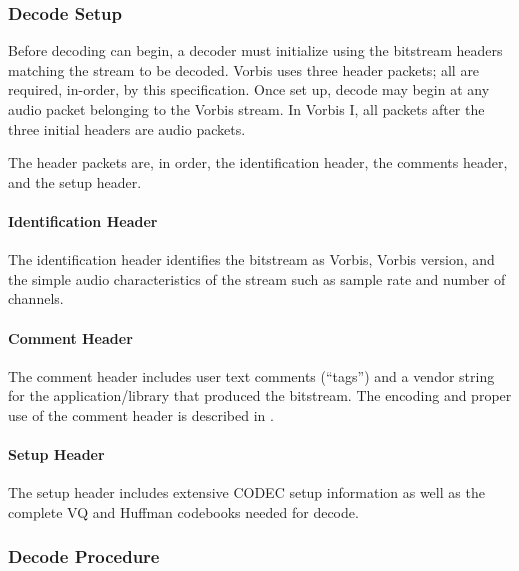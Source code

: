 \subsubsection{Decode Setup}

Before decoding can begin, a decoder must initialize using the
bitstream headers matching the stream to be decoded.  Vorbis uses
three header packets; all are required, in-order, by this
specification. Once set up, decode may begin at any audio packet
belonging to the Vorbis stream. In Vorbis I, all packets after the
three initial headers are audio packets.

The header packets are, in order, the identification
header, the comments header, and the setup header.

\paragraph{Identification Header}
The identification header identifies the bitstream as Vorbis, Vorbis
version, and the simple audio characteristics of the stream such as
sample rate and number of channels.

\paragraph{Comment Header}
The comment header includes user text comments (``tags'') and a vendor
string for the application/library that produced the bitstream.  The
encoding and proper use of the comment header is described in .

\paragraph{Setup Header}
The setup header includes extensive CODEC setup information as well as
the complete VQ and Huffman codebooks needed for decode.


\subsubsection{Decode Procedure}

